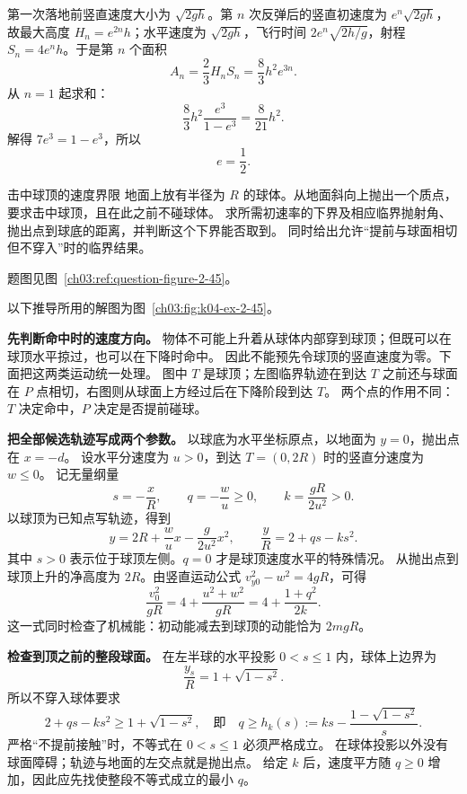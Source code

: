{\begin{xesolution}
第一次落地前竖直速度大小为 $\sqrt{2gh}$。第 $n$ 次反弹后的竖直初速度为 $e^n\sqrt{2gh}$，故最大高度 $H_n=e^{2n}h$；水平速度为 $\sqrt{2gh}$，飞行时间 $2e^n\sqrt{2h/g}$，射程 $S_n=4e^nh$。于是第 $n$ 个面积
\[
A_n=\frac23H_nS_n=\frac83h^2e^{3n}.
\]
从 $n=1$ 起求和：
\[
\frac83h^2\frac{e^3}{1-e^3}=\frac8{21}h^2.
\]
解得 $7e^3=1-e^3$，所以
\[
 \boxed{e=\frac12}.
\]
\end{xesolution}

\begin{origexamplebox}{击中球顶的速度界限}\label{ch03:ex:k04-2-45}
地面上放有半径为 $R$ 的球体。从地面斜向上抛出一个质点，要求击中球顶，且在此之前不碰球体。
求所需初速率的下界及相应临界抛射角、抛出点到球底的距离，并判断这个下界能否取到。
同时给出允许“提前与球面相切但不穿入”时的临界结果。
\par 题图见图~\ref{ch03:ref:question-figure-2-45}。
\KQuestionBT
\end{origexamplebox}
\begin{xesolution}
以下推导所用的解图为图~\ref{ch03:fig:k04-ex-2-45}。

\textbf{先判断命中时的速度方向。}
物体不可能上升着从球体内部穿到球顶；但既可以在球顶水平掠过，也可以在下降时命中。
因此不能预先令球顶的竖直速度为零。下面把这两类运动统一处理。
\SphereClearanceDiagram
图中 $T$ 是球顶；左图临界轨迹在到达 $T$ 之前还与球面在 $P$ 点相切，右图则从球面上方经过后在下降阶段到达 $T$。
两个点的作用不同：$T$ 决定命中，$P$ 决定是否提前碰球。

\textbf{把全部候选轨迹写成两个参数。}
以球底为水平坐标原点，以地面为 $y=0$，抛出点在 $x=-d$。
设水平分速度为 $u>0$，到达 $T=(0,2R)$ 时的竖直分速度为 $w\le0$。
记无量纲量
\[
 s=-\frac{x}{R},\qquad q=-\frac wu\ge0,\qquad
 k=\frac{gR}{2u^2}>0.
\]
以球顶为已知点写轨迹，得到
\[
 y=2R+\frac wu x-\frac{g}{2u^2}x^2,
 \qquad \boxed{\frac{y}{R}=2+qs-ks^2}.
\]
其中 $s>0$ 表示位于球顶左侧。$q=0$ 才是球顶速度水平的特殊情况。
从抛出点到球顶上升的净高度为 $2R$。由竖直运动公式
$v_{y0}^2-w^2=4gR$，可得
\[
 \frac{v_0^2}{gR}
 =4+\frac{u^2+w^2}{gR}
 =\boxed{4+\frac{1+q^2}{2k}}.
\]
这一式同时检查了机械能：初动能减去到球顶的动能恰为 $2mgR$。

\textbf{检查到顶之前的整段球面。}
在左半球的水平投影 $0<s\le1$ 内，球体上边界为
\[
 \frac{y_s}{R}=1+\sqrt{1-s^2}.
\]
所以不穿入球体要求
\[
 2+qs-ks^2\ge1+\sqrt{1-s^2},
 \quad\text{即}\quad
 q\ge h_k(s):=ks-\frac{1-\sqrt{1-s^2}}{s}.
\]
严格“不提前接触”时，不等式在 $0<s\le1$ 必须严格成立。
在球体投影以外没有球面障碍；轨迹与地面的左交点就是抛出点。
给定 $k$ 后，速度平方随 $q\ge0$ 增加，因此应先找使整段不等式成立的最小 $q$。


\end{xesolution}}
